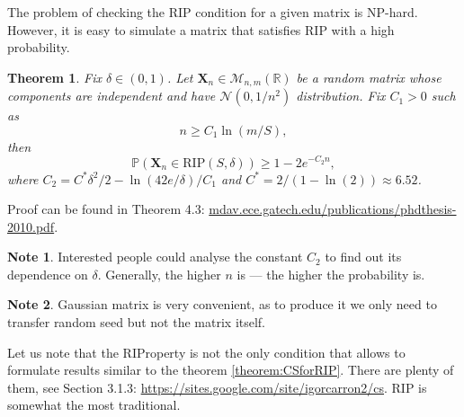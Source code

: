\documentclass[11pt]{article}
\numberwithin{equation}{section}
\newtheorem{theorem}{Theorem}[section]
\theoremstyle{definition}
\newtheorem{remark}{Note}[section]
\begin{document}
The problem of checking the RIP condition for a given matrix is NP-hard.
However, it is easy to simulate a matrix that satisfies RIP with a high probability.

\begin{theorem}
    Fix $\delta \in (0, 1)$.
    Let $\mathbf X_n \in \mathcal M_{n, m} (\mathbb R)$ be a random matrix whose components are independent and have $\mathcal N(0, 1/n^2)$ distribution.
    Fix $C_1 > 0$ such as
    $$ n \geqslant C_1 \ln(m / S), $$
    then 
    $$ \mathbb P(\mathbf X_n \in \textrm{RIP}(S, \delta)) \geq 1 - 2 e^{-C_2 n}, $$
    where $C_2 = C^*\delta^2/2 - \ln (42 e / \delta) / C_1$ and $C^* = 2 / (1 - \ln(2)) \approx 6.52$.
\end{theorem}
Proof can be found in Theorem 4.3: \url{mdav.ece.gatech.edu/publications/phdthesis-2010.pdf}.

\begin{remark}
    Interested people could analyse the constant $C_2$ to find out its dependence on $\delta$.
    Generally, the higher $n$ is --- the higher the probability is.
\end{remark}

\begin{remark}
    Gaussian matrix is very convenient, as to produce it we only need to transfer random seed but not the matrix itself.
\end{remark}


Let us note that the RIProperty  is not the only condition that allows to formulate results similar to the theorem \ref{theorem:CSforRIP}.
There are plenty of them, see Section 3.1.3: \url{https://sites.google.com/site/igorcarron2/cs}.
RIP is somewhat the most traditional.
\end{document}
